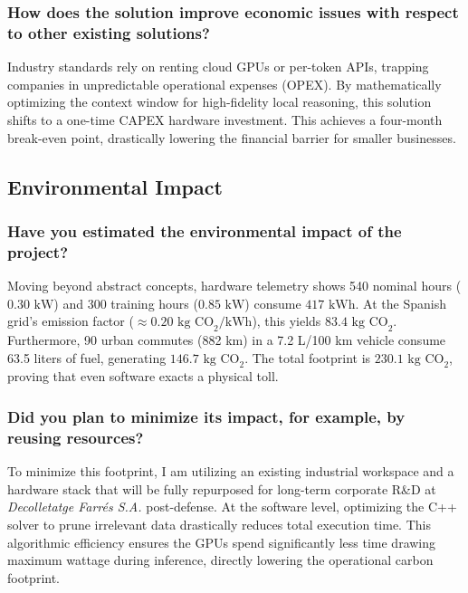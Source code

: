 \subsubsection{How does the solution improve economic issues with respect to other existing solutions?}
\label{subsubsec:solution-improves-economic-issues}

Industry standards rely on renting cloud GPUs or per-token APIs, trapping companies in unpredictable operational expenses (OPEX). By mathematically optimizing the context window for high-fidelity local reasoning, this solution shifts to a one-time CAPEX hardware investment. This achieves a four-month break-even point, drastically lowering the financial barrier for smaller businesses.

\subsection{Environmental Impact}
\label{subsec:environmental-impact}

\subsubsection{Have you estimated the environmental impact of the project?}
\label{subsubsec:estimated-environmental-impact}

Moving beyond abstract concepts, hardware telemetry shows 540 nominal hours ($0.30 \text{ kW}$) and 300 training hours ($0.85 \text{ kW}$) consume $417 \text{ kWh}$. At the Spanish grid's emission factor ($\approx 0.20 \text{ kg CO}_2/\text{kWh}$), this yields $83.4 \text{ kg CO}_2$. Furthermore, 90 urban commutes (882 km) in a 7.2 L/100 km vehicle consume 63.5 liters of fuel, generating $146.7 \text{ kg CO}_2$. The total footprint is $230.1 \text{ kg CO}_2$, proving that even software exacts a physical toll.

\subsubsection{Did you plan to minimize its impact, for example, by reusing resources?}
\label{subsubsec:minimize-environmental-impact}

To minimize this footprint, I am utilizing an existing industrial workspace and a hardware stack that will be fully repurposed for long-term corporate R\&D at \textit{Decolletatge Farrés S.A.} post-defense. At the software level, optimizing the C++ solver to prune irrelevant data drastically reduces total execution time. This algorithmic efficiency ensures the GPUs spend significantly less time drawing maximum wattage during inference, directly lowering the operational carbon footprint.

